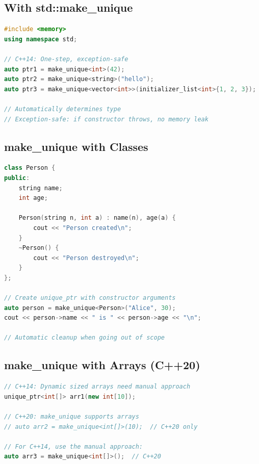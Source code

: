 \hypertarget{with-stdmake_unique}{%
\subsection{With std::make\_unique}\label{with-stdmake_unique}}

\begin{lstlisting}[language={C++}]
#include <memory>
using namespace std;

// C++14: One-step, exception-safe
auto ptr1 = make_unique<int>(42);
auto ptr2 = make_unique<string>("hello");
auto ptr3 = make_unique<vector<int>>(initializer_list<int>{1, 2, 3});

// Automatically determines type
// Exception-safe: if constructor throws, no memory leak
\end{lstlisting}

\hypertarget{make_unique-with-classes}{%
\subsection{make\_unique with Classes}\label{make_unique-with-classes}}

\begin{lstlisting}[language={C++}]
class Person {
public:
    string name;
    int age;
    
    Person(string n, int a) : name(n), age(a) {
        cout << "Person created\n";
    }
    ~Person() {
        cout << "Person destroyed\n";
    }
};

// Create unique_ptr with constructor arguments
auto person = make_unique<Person>("Alice", 30);
cout << person->name << " is " << person->age << "\n";

// Automatic cleanup when going out of scope
\end{lstlisting}

\hypertarget{make_unique-with-arrays-c20}{%
\subsection{make\_unique with Arrays
(C++20)}\label{make_unique-with-arrays-c20}}

\begin{lstlisting}[language={C++}]
// C++14: Dynamic sized arrays need manual approach
unique_ptr<int[]> arr1(new int[10]);

// C++20: make_unique supports arrays
// auto arr2 = make_unique<int[]>(10);  // C++20 only

// For C++14, use the manual approach:
auto arr3 = make_unique<int[]>();  // C++20
\end{lstlisting}

